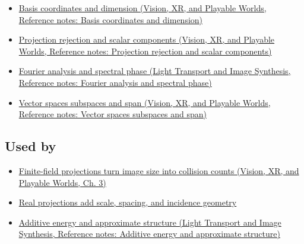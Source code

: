 \hypertarget{appendix-3c73f7862157-prerequisites}{}

\begin{itemize}
\tightlist
\item
  \href{../07-Vision-XR-and-Playable-Worlds/main.pdf\#nameddest=appendix-ce0341f7ea0d}{Basis coordinates and dimension (Vision, XR, and Playable Worlds, Reference notes: Basis coordinates and dimension)}
\item
  \href{../07-Vision-XR-and-Playable-Worlds/main.pdf\#nameddest=appendix-505a502c372a}{Projection rejection and scalar components (Vision, XR, and Playable Worlds, Reference notes: Projection rejection and scalar components)}
\item
  \href{../04-Light-Transport-and-Image-Synthesis/main.pdf\#nameddest=appendix-b60686ba06a1}{Fourier analysis and spectral phase (Light Transport and Image Synthesis, Reference notes: Fourier analysis and spectral phase)}
\item
  \href{../07-Vision-XR-and-Playable-Worlds/main.pdf\#nameddest=appendix-173b52c063ae}{Vector spaces subspaces and span (Vision, XR, and Playable Worlds, Reference notes: Vector spaces subspaces and span)}
\end{itemize}

\subsection{Used by}\label{appendix-3c73f7862157-used-by}

\hypertarget{appendix-3c73f7862157-used-by}{}

\begin{itemize}
\tightlist
\item
  \href{../07-Vision-XR-and-Playable-Worlds/main.pdf\#nameddest=04-visual-computing-ii-ch032-finite-field-projections-turn-image-size-into-collision-counts}{Finite-field projections turn image size into collision counts (Vision, XR, and Playable Worlds, Ch. 3)}
\item
  \hyperref[04-visual-computing-ii-ch033-real-projections-add-scale-spacing-and-incidence-geometry]{Real projections add scale, spacing, and incidence geometry}
\item
  \href{../04-Light-Transport-and-Image-Synthesis/main.pdf\#nameddest=appendix-b0732b22e7d6}{Additive energy and approximate structure (Light Transport and Image Synthesis, Reference notes: Additive energy and approximate structure)}
\end{itemize}

